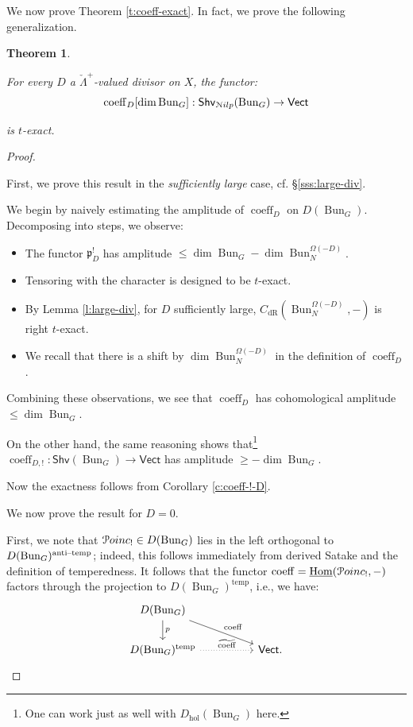\documentclass[reqno,11pt]{amsart}
\numberwithin{equation}{subsection}
\newtheorem{thm}{Theorem}[subsubsection]
\theoremstyle{remark}
\newcounter{steps}[thm]
\newcommand{\sN}{{\EuScript N}}
\newcommand{\sP}{{\EuScript P}}
\newcommand{\fp}{{\mathfrak p}}
\newcommand{\on}{\operatorname}
\newcommand{\ul}{\underline}
\newcommand{\mathendash}{\text{\textendash}}
\newcommand{\Hom}{\on{Hom}}
\newcommand{\Vect}{\mathsf{Vect}}
\newcommand{\Bun}{\on{Bun}}
\newcommand{\coeff}{\on{coeff}}
\newcommand{\Poinc}{\sP oinc}
\newcommand{\Shv}{\mathsf{Shv}}
\newcommand{\temp}{\on{temp}}
\newcommand{\at}{\on{anti}\!\mathendash\!\on{temp}}
\newcommand{\Nilp}{\sN ilp}
\newcommand{\dR}{\on{dR}}
\newcommand{\hol}{\on{hol}}
\begin{document}
We now prove Theorem \ref{t:coeff-exact}. In fact, we prove the 
following generalization.

\begin{thm}\label{t:coeff-d-exact}

For every $D$ a $\check{\Lambda}^+$-valued divisor on $X$, the 
functor:
%
\[
\coeff_D[\dim \Bun_G]:\Shv_{\Nilp}(\Bun_G) \to \Vect
\]

\noindent is $t$-exact.

\end{thm}

\begin{proof}

\step\label{st:coeff-exact-1}

First, we prove this result in the \emph{sufficiently large} case,
cf. \S \ref{sss:large-div}.

We begin by naively estimating the amplitude of $\coeff_D$ on 
$D(\Bun_G)$. Decomposing into steps, we observe:

\begin{itemize}

\item The functor $\fp_D^!$ has amplitude 
$\leq \dim \Bun_G-\dim \Bun_N^{\Omega(-D)}$. 

\item Tensoring
with the character is designed to be $t$-exact. 

\item By Lemma \ref{l:large-div}, for $D$ sufficiently large, 
$C_{\dR}(\Bun_N^{\Omega(-D)},-)$ is right $t$-exact.

\item We recall that there is a shift by 
$\dim \Bun_N^{\Omega(-D)}$ in the definition of $\coeff_D$. 

\end{itemize}

\noindent Combining these observations, we see that 
$\coeff_D$ has cohomological amplitude
$\leq \dim \Bun_G$. 

On the other hand, the same reasoning shows that\footnote{One 
can work just as well with $D_{\hol}(\Bun_G)$ here.}
$\coeff_{D,!}:\Shv(\Bun_G) \to \Vect$ has amplitude $\geq -\dim \Bun_G$.

Now the exactness follows from Corollary \ref{c:coeff-!-D}.

\step 

We now prove the result for $D = 0$.

First, we note that $\Poinc_! \in D(\Bun_G)$ lies in the left orthogonal to 
$D(\Bun_G)^{\at}$; indeed, this follows immediately from derived Satake
and the definition of temperedness. 
It follows that the functor $\coeff = \ul{\Hom}(\Poinc_!,-)$ factors
through the projection to $D(\Bun_G)^{\temp}$, i.e., we have:
%
\[
\begin{tikzcd}
D(\Bun_G) 
\arrow[drr,"\coeff"]
\arrow[d,"p"] \\
D(\Bun_G)^{\temp} 
\arrow[rr,"\widetilde{\coeff}",dotted]
&&
\Vect.
\end{tikzcd}
\]


\end{proof}
\end{document}
